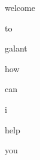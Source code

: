\documentclass[varwidth]{standalone}
\begin{document}
\begin{CJK*}{UTF8}{gbsn}
{\setlength{\fboxsep}{0pt}\colorbox{white!0}{\parbox{0.9\textwidth}{
\colorbox{red!11.88001823425293}{\strut welcome} \colorbox{red!12.36231517791748}{\strut to} \colorbox{red!12.708640098571777}{\strut galant} \colorbox{red!12.668502807617188}{\strut how} \colorbox{red!12.784838676452637}{\strut can} \colorbox{red!12.242908477783203}{\strut i} \colorbox{red!12.771971702575684}{\strut help} \colorbox{red!12.580804824829102}{\strut you} 
}}}
\end{CJK*}
\end{document}
